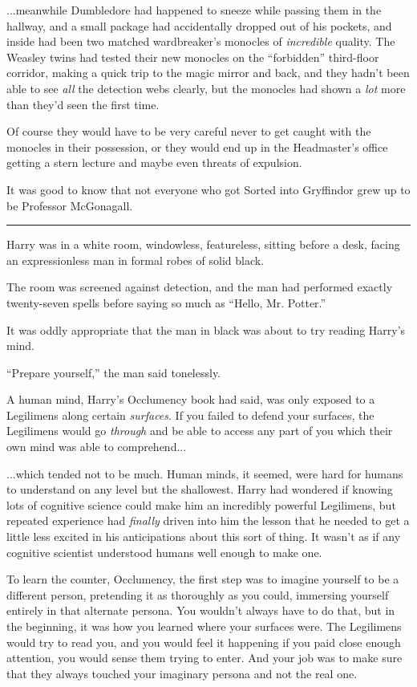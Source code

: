 ...meanwhile Dumbledore had happened to sneeze while passing them
in the hallway, and a small package had accidentally dropped out of his
pockets, and inside had been two matched wardbreaker's monocles of
\emph{incredible} quality. The Weasley twins had tested their new
monocles on the ``forbidden'' third-floor corridor, making a quick trip
to the magic mirror and back, and they hadn't been able to see
\emph{all} the detection webs clearly, but the monocles had shown a
\emph{lot} more than they'd seen the first time.

Of course they would have to be very careful never to get caught with
the monocles in their possession, or they would end up in the
Headmaster's office getting a stern lecture and maybe even threats of
expulsion.

It was good to know that not everyone who got Sorted into Gryffindor
grew up to be Professor McGonagall.

\begin{center}\rule{3in}{0.4pt}\end{center}

Harry was in a white room, windowless, featureless, sitting before a
desk, facing an expressionless man in formal robes of solid black.

The room was screened against detection, and the man had performed
exactly twenty-seven spells before saying so much as ``Hello, Mr.
Potter.''

It was oddly appropriate that the man in black was about to try reading
Harry's mind.

``Prepare yourself,'' the man said tonelessly.

A human mind, Harry's Occlumency book had said, was only exposed to a
Legilimens along certain \emph{surfaces}. If you failed to defend your
surfaces, the Legilimens would go \emph{through} and be able to access
any part of you which their own mind was able to comprehend...

...which tended not to be much. Human minds, it seemed, were hard
for humans to understand on any level but the shallowest. Harry had
wondered if knowing lots of cognitive science could make him an
incredibly powerful Legilimens, but repeated experience had
\emph{finally} driven into him the lesson that he needed to get a little
less excited in his anticipations about this sort of thing. It wasn't as
if any cognitive scientist understood humans well enough to make one.

To learn the counter, Occlumency, the first step was to imagine yourself
to be a different person, pretending it as thoroughly as you could,
immersing yourself entirely in that alternate persona. You wouldn't
always have to do that, but in the beginning, it was how you learned
where your surfaces were. The Legilimens would try to read you, and you
would feel it happening if you paid close enough attention, you would
sense them trying to enter. And your job was to make sure that they
always touched your imaginary persona and not the real one.

